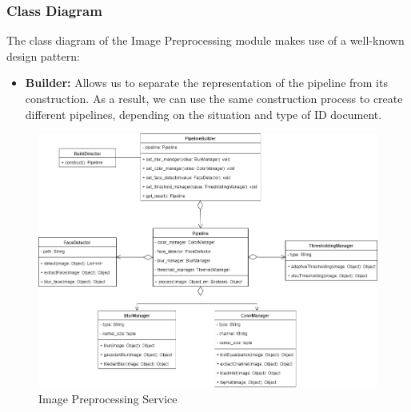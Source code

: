 \documentclass{article}
\begin{document}
\subsubsection{Class Diagram}
The class diagram of the Image Preprocessing module makes use of a well-known design pattern: 
\begin{itemize}
	\item \textbf{Builder:} Allows us to separate the representation of the pipeline from its construction. As a result, we can use the same construction process to create different pipelines, depending on the situation and type of ID document.
\end{itemize}
	\begin{figure}[H]
	    \centering
	    \includegraphics[scale=0.5]{img/imageProcessingClassDiagram.png}
	    \caption{Image Preprocessing Service}
	 \end{figure}
	 \pagebreak
\end{document}
